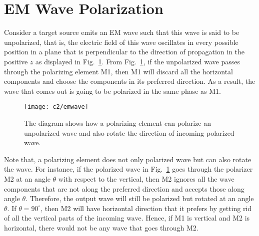  
 \section{EM Wave Polarization}	   \label{chap2:WavePolarisation}
 Consider a target source emits an EM wave such that this wave is said to be unpolarized, that is, the electric field of this wave oscillates in every possible position in a plane that is perpendicular to the direction of propagation in the positive $z$ as displayed in Fig.~\ref{fig:emwave}. From Fig.~\ref{fig:emwave}, if the unpolarized wave passes through the polarizing element M1, then M1 will discard all the horizontal components and choose the components in its preferred direction. As a result, the wave that comes out is going to be polarized in the same phase as M1. 
\begin{figure}[ht]
	    \centering	    
	    \texttt{[image: c2/emwave]}
	    \caption{The diagram shows how a polarizing element can polarize an unpolarized wave and also rotate the direction of incoming polarized wave.}
	    \label{fig:emwave}
       \end{figure}
  \FloatBarrier 
 Note that, a polarizing element does not only polarized wave but can also rotate the wave. For instance, if the polarized wave in Fig.~\ref{fig:emwave} goes through
 the polarizer M2  at an angle $\theta$ with respect to the vertical, then M2 ignores all the wave components that are not along the preferred direction  and accepts those along
 angle $\theta$. Therefore, the output wave will still be polarized but rotated at an angle $\theta$. If $\theta = 90^\circ$, then M2 will have horizontal direction that it prefers
 by getting rid of all the vertical parts of the incoming wave. Hence, if M1 is vertical and M2 is horizontal, there would not be any wave that goes through M2.
 
